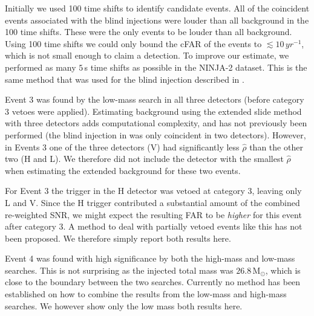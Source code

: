 Initially we used 100 time shifts to identify candidate events. All of the
coincident events associated with the blind injections were louder than
all background in the 100 time shifts. These were the only events to be
louder than all background. Using 100 time shifts we could only bound the cFAR
of the events to $\lesssim 10\,yr^{-1}$, which is not small enough to claim a
detection. To improve our estimate, we performed as many $5\,$s time shifts as
possible in the NINJA-2 dataset. This is the same
method that was used for the blind injection described in
\cite{Colaboration:2011np}. 

Event $3$ was found by the low-mass search in all three detectors
(before category 3 vetoes
were applied).  Estimating background using the extended slide method with
three detectors adds computational complexity, and has not previously been
performed (the blind injection in \cite{Colaboration:2011np} was only
coincident in two detectors). However, in Events 3 one of the three
detectors (V) had significantly less $\hat{\rho}$ than the other two (H and L).
We therefore did not include the detector with the smallest
$\hat{\rho}$ when estimating the extended background for these two events. 

For Event 3 the trigger in the H detector was vetoed at
category 3, leaving only L and V. Since the H trigger contributed a substantial
amount of the combined re-weighted SNR, we might expect the resulting FAR to be 
\emph{higher} for this event after category 3. A method to deal 
with partially vetoed events like this has not been proposed. We therefore 
simply report both results here.

Event 4 was found with high significance by both the high-mass and low-mass
searches. This is not surprising as the injected total mass was
$26.8\,\mathrm{M}_\odot$, which is close to the boundary between the two
searches. Currently no method has been established on how to combine the
results from the low-mass and high-mass searches. 
We however show only the low mass both results here.

